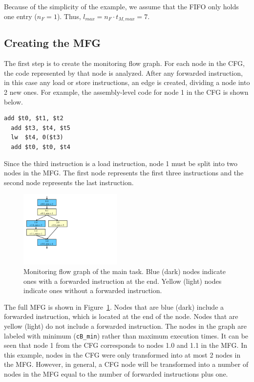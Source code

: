 Because of the simplicity of the example, we assume that the FIFO only holds one entry ($n_F = 1$). Thus, $l_{max} = n_F \cdot t_{M, max} = 7$.

\subsection{Creating the MFG}

The first step is to create the monitoring flow graph. For each node in the
CFG, the code represented by that node is analyzed. After any forwarded
instruction, in this case any load or store instructions, an edge is created,
dividing a node into 2 new ones.
For example, the assembly-level code for node 1 in the CFG is shown below.
\vspace{-0.2in}
\lstset{numbers=left, 
  firstnumber=1, 
  xleftmargin=2em, 
  numbersep=1em, 
  basicstyle=\ttfamily, 
  title=node 1, 
  } 
\begin{lstlisting}[frame=tb]
  add $t0, $t1, $t2
  add $t3, $t4, $t5
  lw  $t4, 0($t3)
  add $t0, $t0, $t4
\end{lstlisting}
Since the third instruction is a load instruction, node 1 must be split into
two nodes in the MFG. The first node represents the first three instructions and
the second node represents the last instruction. 

\begin{figure}[htb]
  \begin{center}
    \vspace{-0.0in}
    \includegraphics[width=2in]{monitoring_wcet/figs/mfg.pdf}
    \vspace{-0.1in}
    \caption{Monitoring flow graph of the main task. Blue (dark) nodes indicate ones with a forwarded instruction at the end. Yellow (light) nodes indicate ones without a forwarded instruction.}
    \label{fig:app.mfg}
    \vspace{-0.2in}
  \end{center}
\end{figure}

The full MFG is shown in
Figure~\ref{fig:app.mfg}. Nodes that are blue (dark) include a forwarded
instruction, which is located at the end of the node. Nodes that are yellow
(light) do not include a forwarded instruction. The nodes in the graph are
labeled with minimum ({\tt cB\_min}) rather than maximum execution times. It can be seen that
node 1 from the CFG corresponds to nodes 1.0 and 1.1 in the MFG. In this example,
nodes in the CFG were only transformed into at most 2 nodes in the MFG.
However, in general, a CFG node will be transformed into a number of nodes in
the MFG equal to the number of forwarded instructions plus one.

